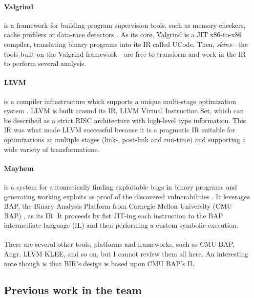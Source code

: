 \documentclass{kththesis}
\begin{document}
\paragraph{Valgrind} is a framework for building program supervision tools, such
as memory checkers, cache profilers or data-race detectors
\cite{nethercote_valgrind:_2003}. As its core, Valgrind is a JIT x86-to-x86
compiler, translating binary programs into its IR called UCode. Then,
\textit{skins}---the tools built on the Valgrind framework---are free to
transform and work in the IR to perform several analysis.

\paragraph{LLVM} is a compiler infrastructure which supports a unique
multi-stage optimization system \cite{lattner_llvm:_2002}. LLVM is built around
its IR, LLVM Virtual Instruction Set, which can be described as a strict RISC
architecture with high-level type information. This IR was what made LLVM
successful because it is a pragmatic IR suitable for optimizations at multiple
stages (link-, post-link and run-time) and supporting a wide variety of
transformations.

\paragraph{Mayhem} is a system for automatically finding exploitable bugs in
binary programs and generating working exploits as proof of the discovered
vulnerabilities \cite{cha_unleashing_2012}. It leverages BAP, the Binary
Analysis Platform from Carnegie Mellon University (CMU BAP)
\cite{brumley_bap:_2011}, as its IR. It proceeds by fist JIT-ing each
instruction to the BAP intermediate language (IL) and then performing a custom
symbolic execution.

\paragraph{} There are several other tools, platforms and frameworks, such as
CMU BAP, Angr, LLVM KLEE, and so on, but I cannot review them all here. An
interesting note though is that BIR's design is based upon CMU BAP's IL.

\subsection{Previous work in the team}
\end{document}
